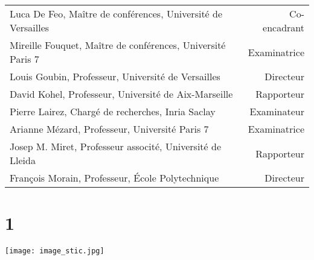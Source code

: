 \documentclass[a4paper, titlepage, 12pt]{book}
\makeatletter
\newcommand*{\cleartoleftpage}{%
  \clearpage
    \if@twoside
    \ifodd\c@page
      \hbox{}\newpage
      \if@twocolumn
        \hbox{}\newpage
      \fi
    \fi
  \fi
}
\makeatother
\begin{document}
\begin{breakbox}
\begin{tabular}{lr}
\noindent
Luca De Feo, Maître de conférences, Université de Versailles& Co-encadrant\\
Mireille Fouquet, Maître de conférences, Université Paris 7& Examinatrice\\
Louis Goubin, Professeur, Université de Versailles& Directeur\\
David Kohel, Professeur, Université de Aix-Marseille& Rapporteur\\
Pierre Lairez, Chargé de recherches, Inria Saclay& Examinateur\\ 
Arianne Mézard, Professeur, Université Paris 7& Examinatrice\\
Josep M. Miret, Professeur associté, Université de Lleida& Rapporteur\\
François Morain, Professeur, \'Ecole Polytechnique& Directeur\\

\end{tabular}

\vspace{6ex}

\end{breakbox}
\restoregeometry

%
%
%



\mainmatter
\pagestyle{fancy}

%


\chapter{1}


\cleartoleftpage
\pagestyle{empty}
\texttt{[image: image\_stic.jpg]}

\vspace{1ex}
\end{document}
